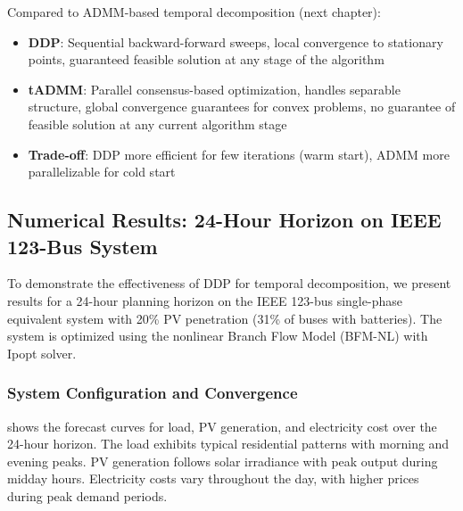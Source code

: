 Compared to ADMM-based temporal decomposition (next chapter):
\begin{itemize}
    \item \textbf{DDP}: Sequential backward-forward sweeps, local convergence to stationary points, guaranteed feasible solution at any stage of the algorithm
    \item \textbf{tADMM}: Parallel consensus-based optimization, handles separable structure, global convergence guarantees for convex problems, no guarantee of feasible solution at any current algorithm stage
    \item \textbf{Trade-off}: DDP more efficient for few iterations (warm start), ADMM more parallelizable for cold start
\end{itemize}

\subsection{Numerical Results: 24-Hour Horizon on IEEE 123-Bus System}

To demonstrate the effectiveness of DDP for temporal decomposition, we present results for a 24-hour planning horizon on the IEEE 123-bus single-phase equivalent system with 20\% PV penetration (31\% of buses with batteries). The system is optimized using the nonlinear Branch Flow Model (BFM-NL) with Ipopt solver.

\subsubsection{System Configuration and Convergence}

 shows the forecast curves for load, PV generation, and electricity cost over the 24-hour horizon. The load exhibits typical residential patterns with morning and evening peaks. PV generation follows solar irradiance with peak output during midday hours. Electricity costs vary throughout the day, with higher prices during peak demand periods.

